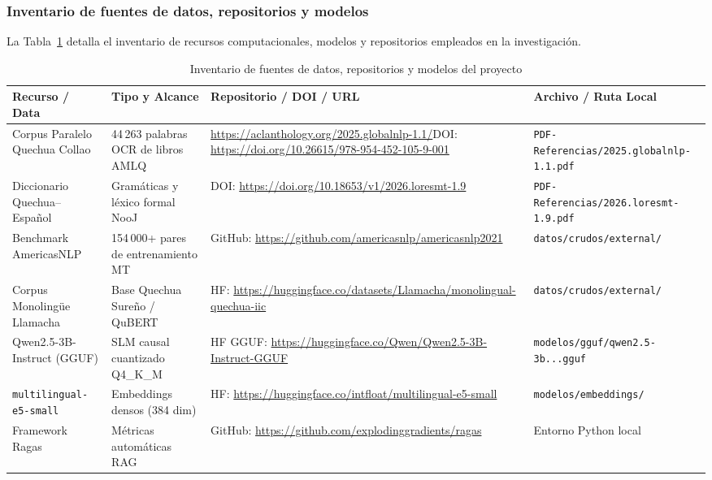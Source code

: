 \subsubsection{Inventario de fuentes de datos, repositorios y modelos}

La Tabla~\ref{tab:inventario_data_repos} detalla el inventario de recursos computacionales, modelos y repositorios empleados en la investigación.

\begin{table}[H]
\centering
\caption{Inventario de fuentes de datos, repositorios y modelos del proyecto}
\label{tab:inventario_data_repos}
\small
\begin{tabularx}{\textwidth}{@{}p{2.8cm}p{3.4cm}X p{3.0cm}@{}}
\toprule
\textbf{Recurso / Data} & \textbf{Tipo y Alcance} & \textbf{Repositorio / DOI / URL} & \textbf{Archivo / Ruta Local} \\
\midrule
Corpus Paralelo Quechua Collao & 44\,263 palabras OCR de libros AMLQ \citep{Orcotoma2025} & \url{https://aclanthology.org/2025.globalnlp-1.1/}\newline DOI: \url{https://doi.org/10.26615/978-954-452-105-9-001} & \texttt{PDF-Referencias/\allowbreak 2025.globalnlp-1.1.pdf} \\
\midrule
Diccionario Quechua--Español & Gramáticas y léxico formal NooJ \citep{Duran2026} & DOI: \url{https://doi.org/10.18653/v1/2026.loresmt-1.9} & \texttt{PDF-Referencias/\allowbreak 2026.loresmt-1.9.pdf} \\
\midrule
Benchmark AmericasNLP & 154\,000+ pares de entrenamiento MT & GitHub: \url{https://github.com/americasnlp/americasnlp2021} & \texttt{datos/crudos/\allowbreak external/} \\
\midrule
Corpus Monolingüe Llamacha & Base Quechua Sureño / QuBERT & HF: \url{https://huggingface.co/datasets/Llamacha/monolingual-quechua-iic} & \texttt{datos/crudos/\allowbreak external/} \\
\midrule
Qwen2.5-3B-Instruct (GGUF) & SLM causal cuantizado Q4\_K\_M & HF GGUF: \url{https://huggingface.co/Qwen/Qwen2.5-3B-Instruct-GGUF} & \texttt{modelos/gguf/\allowbreak qwen2.5-3b...gguf} \\
\midrule
\texttt{multilingual-e5-small} & Embeddings densos (384 dim) \citep{Wang2022} & HF: \url{https://huggingface.co/intfloat/multilingual-e5-small} & \texttt{modelos/embeddings/} \\
\midrule
Framework Ragas & Métricas automáticas RAG \citep{Ragas2024} & GitHub: \url{https://github.com/explodinggradients/ragas} & Entorno Python local \\
\bottomrule
\end{tabularx}
\end{table}

